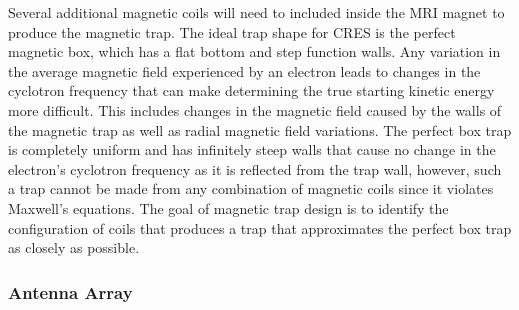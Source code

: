 Several additional magnetic coils will need to included inside the MRI magnet to produce the magnetic trap. The ideal trap shape for CRES is the perfect magnetic box, which has a flat bottom and step function walls. Any variation in the average magnetic field experienced by an electron leads to changes in the cyclotron frequency that can make determining the true starting kinetic energy more difficult. This includes changes in the magnetic field caused by the walls of the magnetic trap as well as radial magnetic field variations. The perfect box trap is completely uniform and has infinitely steep walls that cause no change in the electron's cyclotron frequency as it is reflected from the trap wall, however, such a trap cannot be made from any combination of magnetic coils since it violates Maxwell's equations. The goal of magnetic trap design is to identify the configuration of coils that produces a trap that approximates the perfect box trap as closely as possible.

\subsubsection*{Antenna Array}


